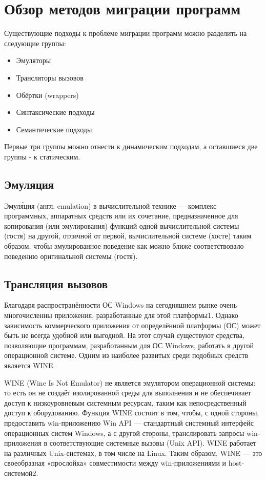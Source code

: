 \section{Обзор методов миграции программ}
Существующие подходы к проблеме миграции программ можно разделить на следующие группы:
\begin{itemize}
	\item Эмуляторы
	\item Трансляторы вызовов
	\item Обёртки (wrappers)
	\item Синтаксические подходы
	\item Семантические подходы
\end{itemize}

Первые три группы можно отнести к динамическим подходам, а оставшиеся две группы - к статическим.

\subsection{Эмуляция}
Эмуля́ция (англ. emulation) в вычислительной технике — комплекс программных, аппаратных средств или их сочетание, предназначенное для копирования (или эмулирования) функций одной вычислительной системы (гостя) на другой, отличной от первой, вычислительной системе (хосте) таким образом, чтобы эмулированное поведение как можно ближе соответствовало поведению оригинальной системы (гостя).

\subsection{Трансляция вызовов}
Благодаря распространённости ОС Windows на сегодняшнем рынке очень многочисленны приложения, разработанные для этой платформы1. Однако зависимость коммерческого приложения от определённой платформы (ОС) может быть не всегда удобной или выгодной. На этот случай существуют средства, позволяющие программам, разработанным для ОС Windows, работать в другой операционной системе. Одним из наиболее развитых среди подобных средств является WINE.

WINE (Wine Is Not Emulator) не является эмулятором операционной системы: то есть он не создаёт изолированной среды для выполнения и не обеспечивает доступ к низкоуровневым системным ресурсам, таким как непосредственный доступ к оборудованию. Функция WINE состоит в том, чтобы, с одной стороны, предоставить win-приложению Win API — стандартный системный интерфейс операционных систем Windows, а с другой стороны, транслировать запросы win-приложения в соответствующие системные вызовы (Unix API). WINE работает на различных Unix-системах, в том числе на Linux. Таким образом, WINE — это своеобразная «прослойка» совместимости между win-приложениями и host-системой2.

